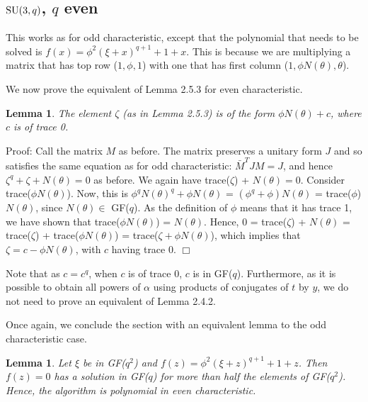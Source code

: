 \documentclass[12pt]{report}
\newtheorem{lemma}[definition]{Lemma}
\newenvironment{proof}{\normalsize {\sc Proof}:}{{\hfill $\Box$ \\}}
\def\SU{{\rm SU}}
\begin{document}
\subsection{$\SU(3, q)$, $q$ even}

This works as for odd characteristic, except that the polynomial that needs to be solved is $f(x) = \phi^2(\xi + x)^{q+1} + 1 + x$. This is because we are multiplying a matrix that has top row ($1, \phi, 1$) with one that has first column ($1, \phi N(\theta), \theta$).

We now prove the equivalent of Lemma 2.5.3 for even characteristic.

\begin{lemma}
The element $\zeta$ (as in Lemma 2.5.3) is of the form $\phi N(\theta) + c$, where $c$ is of trace 0.
\end{lemma}

\begin{proof}
Call the matrix $M$ as before. The matrix preserves a unitary form $J$ and so satisfies the same equation as for odd characteristic: $\bar{M}^T JM = J$, and hence $\zeta^q + \zeta + N(\theta) = 0$ as before. We again have trace($\zeta$) + $N(\theta) = 0$. Consider trace($\phi N(\theta)$). Now, this is $\phi^q N(\theta)^q + \phi N(\theta)$ = $(\phi^q + \phi) N(\theta)$ = trace($\phi$)$N(\theta)$, since $N(\theta) \in$ GF($q$). As the definition of $\phi$ means that it has trace 1, we have shown that trace($\phi N(\theta)$) = $N(\theta)$. Hence, 0 = trace($\zeta$) + $N(\theta)$ = trace($\zeta$) + trace($\phi N(\theta)$) = trace($\zeta + \phi N(\theta)$), which implies that $\zeta = c - \phi N(\theta)$, with $c$ having trace 0.
\end{proof}

Note that as $c = c^q$, when $c$ is of trace 0, $c$ is in GF($q$). Furthermore, as it is possible to obtain all powers of $\alpha$ using products of conjugates of $t$ by $y$, we do not need to prove an equivalent of Lemma 2.4.2.

Once again, we conclude the section with an equivalent lemma to the odd characteristic case.

\begin{lemma}
Let $\xi$ be in GF($q^2$) and $f(z) = \phi^2 (\xi + z)^{q+1} + 1 + z$. Then $f(z) = 0$ has a solution in GF($q$) for more than half the elements of GF($q^2$). Hence, the algorithm is polynomial in even characteristic.
\end{lemma}
\end{document}
